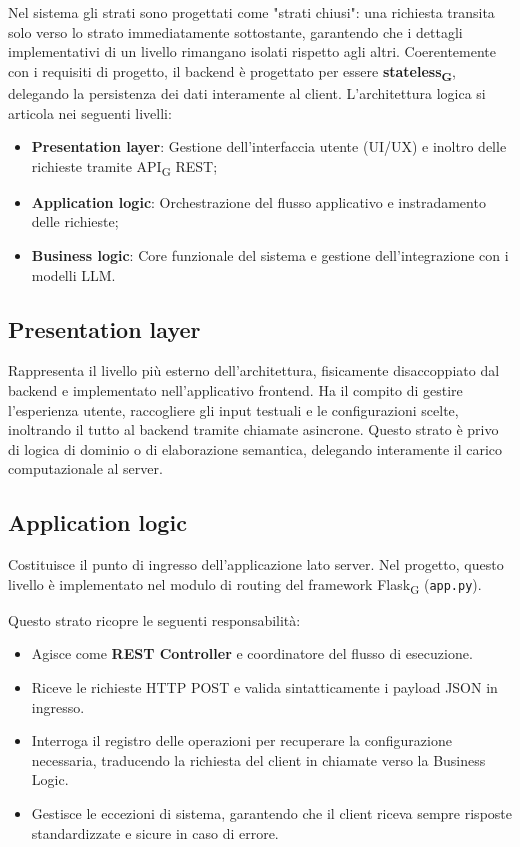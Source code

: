 \documentclass[11pt,a4paper]{article}
\newcommand{\gls}[1]{#1\textsubscript{G}}
\begin{document}
Nel sistema gli strati sono progettati come "strati chiusi": una richiesta transita solo verso lo strato immediatamente sottostante, garantendo che i dettagli implementativi di un livello rimangano isolati rispetto agli altri. Coerentemente con i requisiti di progetto, il backend è progettato per essere \textbf{\gls{stateless}}, delegando la persistenza dei dati interamente al client. L'architettura logica si articola nei seguenti livelli:
\begin{itemize}
    \item \textbf{Presentation layer}: Gestione dell'interfaccia utente (UI/UX) e inoltro delle richieste tramite \gls{API} REST;
    \item \textbf{Application logic}: Orchestrazione del flusso applicativo e instradamento delle richieste;
    \item \textbf{Business logic}: Core funzionale del sistema e gestione dell'integrazione con i modelli LLM.
\end{itemize}

\subsection{Presentation layer}
Rappresenta il livello più esterno dell'architettura, fisicamente disaccoppiato dal backend e implementato nell'applicativo frontend. Ha il compito di gestire l'esperienza utente, raccogliere gli input testuali e le configurazioni scelte, inoltrando il tutto al backend tramite chiamate asincrone. Questo strato è privo di logica di dominio o di elaborazione semantica, delegando interamente il carico computazionale al server.

\subsection{Application logic}
Costituisce il punto di ingresso dell'applicazione lato server. Nel progetto, questo livello è implementato nel modulo di routing del framework \gls{Flask} (\texttt{app.py}).

Questo strato ricopre le seguenti responsabilità:
\begin{itemize}
    \item Agisce come \textbf{REST Controller} e coordinatore del flusso di esecuzione.
    \item Riceve le richieste HTTP POST e valida sintatticamente i payload JSON in ingresso.
    \item Interroga il registro delle operazioni per recuperare la configurazione necessaria, traducendo la richiesta del client in chiamate verso la Business Logic.
    \item Gestisce le eccezioni di sistema, garantendo che il client riceva sempre risposte standardizzate e sicure in caso di errore.
\end{itemize}
\end{document}
